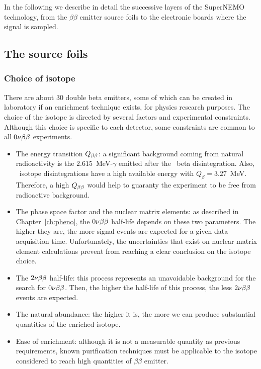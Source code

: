 In the following we describe in detail the successive layers of the SuperNEMO technology, from the $\beta\beta$ emitter source foils to the electronic boards where the signal is sampled.


\subsection{The source foils}

\subsubsection*{Choice of isotope}

There are about $30$ double beta emitters, some of which can be created in laboratory if an enrichment technique exists, for physics research purposes.
The choice of the isotope is directed by several factors and experimental constraints.
Although this choice is specific to each detector, some constraints are common to all $0\nu\beta\beta$ experiments.
\begin{itemize}
\item The energy transition $Q_{\beta\beta}$: a significant background coming from natural radioactivity is the $2.615$~MeV-$\gamma$ emitted after the \Tl\ beta disintegration.
  Also, \Bi\ isotope disintegrations have a high available energy with ${Q_{\beta}=3.27}$~MeV.
  Therefore, a high $Q_{\beta\beta}$ would help to guaranty the experiment to be free from radioactive background.
\item The phase space factor and the nuclear matrix elements: as described in Chapter~\ref{ch:pheno}, the $0\nu\beta\beta$ half-life depends on these two parameters.
  The higher they are, the more signal events are expected for a given data acquisition time.
  Unfortunately, the uncertainties that exist on nuclear matrix element calculations prevent from reaching a clear conclusion on the isotope choice.
\item The $2\nu\beta\beta$ half-life: this process represents an unavoidable background for the search for $0\nu\beta\beta$.
Then, the higher the half-life of this process, the less $2\nu\beta\beta$ events are expected.
\item The natural abundance: the higher it is, the more we can produce substantial quantities of the enriched isotope.
\item Ease of enrichment: although it is not a measurable quantity as previous requirements, known purification techniques must be applicable to the isotope considered to reach high quantities of $\beta\beta$ emitter.
\end{itemize}
